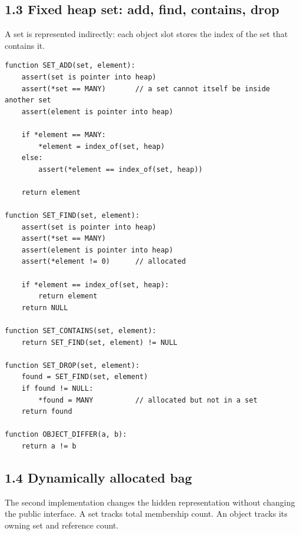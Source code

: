 \documentclass[11pt]{article}
\begin{document}
\subsection{1.3 Fixed heap set: add, find, contains,
drop}\label{fixed-heap-set-add-find-contains-drop}

A set is represented indirectly: each object slot stores the index of
the set that contains it.

\begin{verbatim}
function SET_ADD(set, element):
    assert(set is pointer into heap)
    assert(*set == MANY)       // a set cannot itself be inside another set
    assert(element is pointer into heap)

    if *element == MANY:
        *element = index_of(set, heap)
    else:
        assert(*element == index_of(set, heap))

    return element

function SET_FIND(set, element):
    assert(set is pointer into heap)
    assert(*set == MANY)
    assert(element is pointer into heap)
    assert(*element != 0)      // allocated

    if *element == index_of(set, heap):
        return element
    return NULL

function SET_CONTAINS(set, element):
    return SET_FIND(set, element) != NULL

function SET_DROP(set, element):
    found = SET_FIND(set, element)
    if found != NULL:
        *found = MANY          // allocated but not in a set
    return found

function OBJECT_DIFFER(a, b):
    return a != b
\end{verbatim}

\subsection{1.4 Dynamically allocated
bag}\label{dynamically-allocated-bag}

The second implementation changes the hidden representation without
changing the public interface. A set tracks total membership count. An
object tracks its owning set and reference count.
\end{document}
